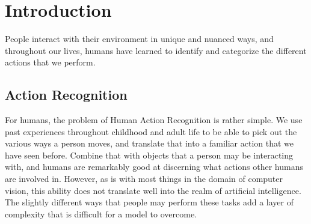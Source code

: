 
\chapter{Introduction} %

\label{Chapter1} %




People interact with their environment in unique and nuanced ways, and throughout our lives, humans have learned to identify and categorize the different actions that we perform.

\section{Action Recognition}

For humans, the problem of Human Action Recognition is rather simple. We use past experiences throughout childhood and adult life to be able to pick out the various ways a person moves, and translate that into a familiar action that we have seen before. Combine that with objects that a person may be interacting with, and humans are remarkably good at discerning what actions other humans are involved in. However, as is with most things in the domain of computer vision, this ability does not translate well into the realm of artificial intelligence. The slightly different ways that people may perform these tasks add a layer of complexity that is difficult for a model to overcome.

